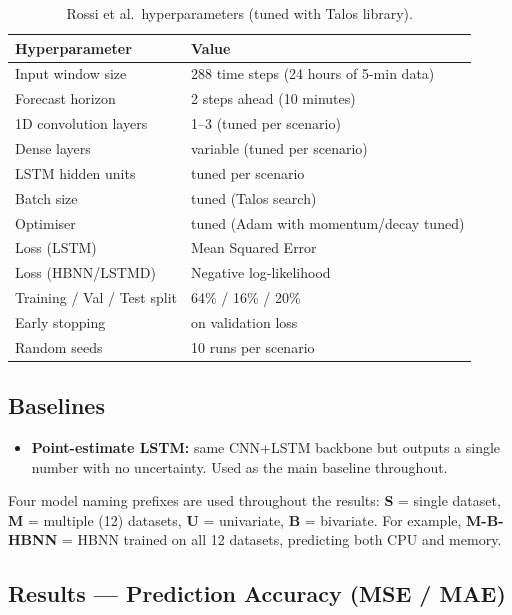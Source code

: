 \documentclass[12pt,a4paper]{article}
\begin{document}
\begin{table}[H]
\centering
\small
\caption{Rossi et al.\ hyperparameters (tuned with Talos library).}
\begin{tabular}{@{}ll@{}}
\toprule
\textbf{Hyperparameter} & \textbf{Value} \\
\midrule
Input window size & 288 time steps (24 hours of 5-min data) \\
Forecast horizon & 2 steps ahead (10 minutes) \\
1D convolution layers & 1--3 (tuned per scenario) \\
Dense layers & variable (tuned per scenario) \\
LSTM hidden units & tuned per scenario \\
Batch size & tuned (Talos search) \\
Optimiser & tuned (Adam with momentum/decay tuned) \\
Loss (LSTM) & Mean Squared Error \\
Loss (HBNN/LSTMD) & Negative log-likelihood \\
Training / Val / Test split & 64\% / 16\% / 20\% \\
Early stopping & on validation loss \\
Random seeds & 10 runs per scenario \\
\bottomrule
\end{tabular}
\end{table}

\subsection{Baselines}

\begin{itemize}
  \item \textbf{Point-estimate LSTM:} same CNN+LSTM backbone but outputs a
        single number with no uncertainty. Used as the main baseline
        throughout.
\end{itemize}

Four model naming prefixes are used throughout the results:
\textbf{S} = single dataset, \textbf{M} = multiple (12) datasets,
\textbf{U} = univariate, \textbf{B} = bivariate.
For example, \textbf{M-B-HBNN} = HBNN trained on all 12 datasets, predicting
both CPU and memory.

\subsection{Results --- Prediction Accuracy (MSE / MAE)}
\end{document}
